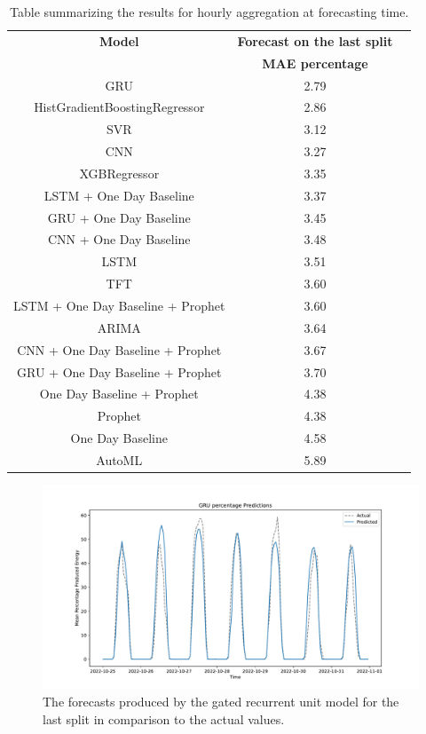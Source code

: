 \begin{table}[H]
\centering
\begin{tabular}{|c|c|c|}
\hline
\textbf{Model} & \textbf{Forecast on the last split}\\
 & \textbf{MAE percentage}\\
\hline
GRU & 2.79\\
\hline
HistGradientBoostingRegressor & 2.86\\
\hline
SVR & 3.12\\
\hline
CNN & 3.27\\
\hline
XGBRegressor & 3.35\\
\hline
LSTM + One Day Baseline & 3.37\\
\hline
GRU + One Day Baseline & 3.45\\
\hline
CNN + One Day Baseline & 3.48\\
\hline
LSTM & 3.51\\
\hline
TFT & 3.60\\
\hline
LSTM + One Day Baseline + Prophet & 3.60\\
\hline
ARIMA & 3.64\\
\hline
CNN + One Day Baseline + Prophet & 3.67\\
\hline
GRU + One Day Baseline + Prophet & 3.70\\
\hline
One Day Baseline + Prophet & 4.38\\
\hline
Prophet & 4.38\\
\hline
One Day Baseline & 4.58\\
\hline
AutoML & 5.89\\
\hline
\end{tabular}
\caption{Table summarizing the results for hourly aggregation at forecasting time.}
\label{tab:productionhourlyresultsforecast}
\end{table}

\begin{figure}[H]
\centering
\includegraphics[width=1\textwidth]{images/production/GRU_percentage}
\caption{The forecasts produced by the gated recurrent unit model for the last split in comparison to the actual values.}
\label{fig:productiongruhourlyforecasts}
\end{figure}

